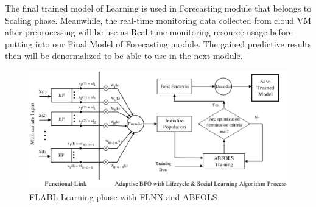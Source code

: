 \documentclass[runningheads]{llncs}
\begin{document}
The final trained model of Learning is used in Forecasting module that belongs to Scaling phase. Meanwhile, the real-time monitoring data collected from cloud VM after preprocessing will be use as Real-time monitoring resource usage before putting into our Final Model of Forecasting module. The gained predictive results then will be denormalized to be able to use in the next module.


\begin{figure}
	\begin{center}
		\includegraphics[width=1.0\textwidth]{images/pdf/FLBFONN_training.eps}
		\caption{ FLABL Learning phase with FLNN and ABFOLS }
		\label{FLBFONN_process}
	\end{center}
\end{figure}
\end{document}
